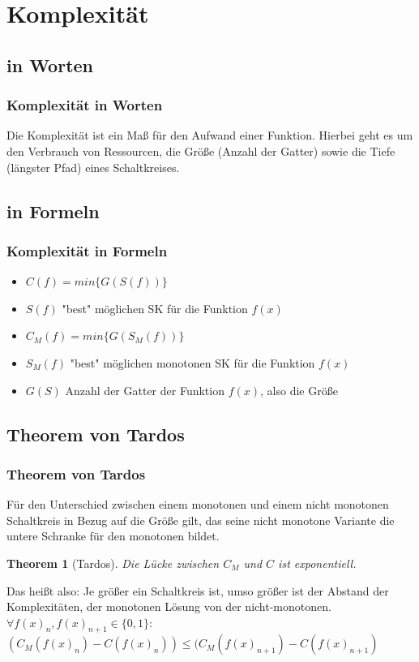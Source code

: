 \documentclass[hyperref={pdfpagelabels=false}]{beamer} %
\newtheorem{thm}{Theorem}
\begin{document}
  \section{Komplexität}
  \subsection*{in Worten}
    \begin{frame}%
    \frametitle{Komplexität in Worten}
    Die Komplexität ist ein Maß für den Aufwand einer Funktion.
    Hierbei geht es um den Verbrauch von Ressourcen, die Größe (Anzahl der Gatter) sowie die Tiefe (längster Pfad)
    eines Schaltkreises.\\
  \end{frame}

  \subsection*{in Formeln}
  \begin{frame}
    \frametitle{Komplexität in Formeln}
    \begin{itemize}
      \item $C(f) = min \{G(S(f))\}$
      \item $S(f)$ "best" möglichen SK für die Funktion $f(x)$
      \item $C_M(f) = min \{G(S_M(f))\}$
      \item $S_M(f)$ "best" möglichen monotonen SK für die Funktion $f(x)$
      \item $G(S)$ Anzahl der Gatter der Funktion $f(x)$, also die Größe
    \end{itemize}
  \end{frame}

  \subsection{Theorem von Tardos}
  \begin{frame}
    \frametitle{Theorem von Tardos}
    Für den Unterschied zwischen einem monotonen und einem nicht monotonen Schaltkreis in Bezug auf die Größe gilt, das seine nicht monotone Variante die untere Schranke für den monotonen bildet.
    \begin{thm}[Tardos]
      Die Lücke zwischen $C_{M}$ und $C$ ist exponentiell.
    \end{thm}
    Das heißt also: Je größer ein Schaltkreis ist, umso größer ist der Abstand der Komplexit\"aten, der monotonen Lösung von der nicht-monotonen.\\
    $\forall f(x)_n, f(x)_{n+1} \in \{0,1\}:$\\$(C_M(f(x)_n) - C(f(x)_n)) \leq (C_M(f(x)_{n+1}) - C(f(x)_{n+1})$
  \end{frame}
\end{document}

